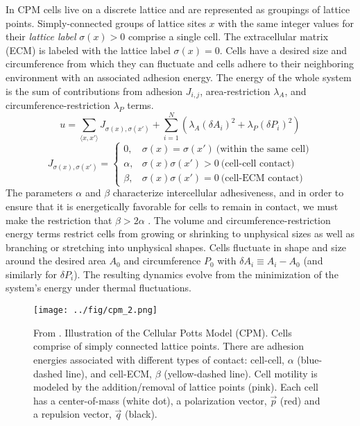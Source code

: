 \documentclass[phys,prelim]{puthesis}
\begin{document}
In CPM cells live on a discrete lattice and are represented as groupings of lattice points. Simply-connected groups of lattice sites $x$ with the same integer values for their \textit{lattice label} $\sigma(x)>0$ comprise a single cell. The extracellular matrix (ECM) is labeled with the lattice label $\sigma(x)=0$. Cells have a desired size and circumference from which they can fluctuate and cells adhere to their neighboring environment with an associated adhesion energy. The energy of the whole system is the sum of contributions from adhesion $J_{i,j}$, area-restriction $\lambda_A$, and circumference-restriction $\lambda_P$ terms.
\begin{equation}
    u = \sum_{\langle x,x' \rangle} J_{\sigma(x),\sigma(x')} + \sum_{i=1}^N \left( \lambda_A (\delta A_i)^2 + \lambda_P (\delta P_i)^2 \right)
\end{equation}
\begin{equation}
    J_{\sigma(x),\sigma(x')} =
    \begin{cases}
        0, &\sigma(x)=\sigma(x') \ \text{(within the same cell)} \\
        \alpha, &\sigma(x)\sigma(x')>0 \ \text{(cell-cell contact)} \\
        \beta, &\sigma(x)\sigma(x')=0 \ \text{(cell-ECM contact)}
    \end{cases}
\end{equation}
The parameters $\alpha$ and $\beta$ characterize intercellular adhesiveness, and in order to ensure that it is energetically favorable for cells to remain in contact, we must make the restriction that $\beta > 2\alpha$ \cite{szabo2010collective}. The volume and circumference-restriction energy terms restrict cells from growing or shrinking to unphysical sizes as well as branching or stretching into unphysical shapes. Cells fluctuate in shape and size around the desired area $A_0$ and circumference $P_0$ with $\delta A_i \equiv A_i-A_0$ (and similarly for $\delta P_i$). The resulting dynamics evolve from the minimization of the system’s energy under thermal fluctuations.

\begin{figure}[ht]
    \centering
        \texttt{[image: ../fig/cpm\_2.png]}
    \caption{From \cite{varennes2015sense}. Illustration of the Cellular Potts Model (CPM). Cells comprise of simply connected lattice points. There are adhesion energies associated with different types of contact: cell-cell, $\alpha$ (blue-dashed line), and cell-ECM, $\beta$ (yellow-dashed line). Cell motility is modeled by the addition/removal of lattice points (pink). Each cell has a center-of-mass (white dot), a polarization vector, $\vec{p}$ (red) and a repulsion vector, $\vec{q}$ (black).} \label{fig:CPM1}
\end{figure}
\end{document}
